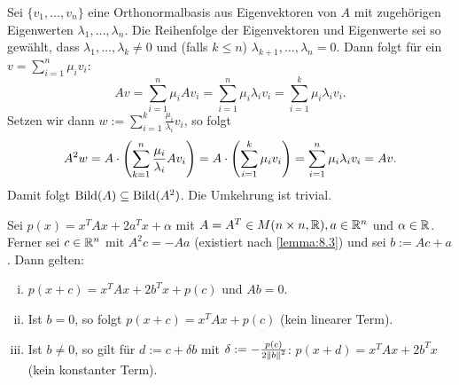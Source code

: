 \begin{beweis}
	Sei $\{v_1,\dots,v_n\}$ eine Orthonormalbasis aus Eigenvektoren von $A$ mit zugehörigen Eigenwerten $\lambda_1,\dots,\lambda_n$.
	Die Reihenfolge der Eigenvektoren und Eigenwerte sei so gewählt, dass $\lambda_1,\dots,\lambda_k \neq 0$ und (falls $k \leq n$) $\lambda_{k+1}, \dots, \lambda_n = 0$.
	Dann folgt für ein $v = \sum_{i=1}^{n} \mu_i v_i$:
	\[
		Av = \sum_{i=1}^{n} \mu_i Av_i = \sum_{i=1}^{n} \mu_i \lambda_i v_i = \sum_{i=1}^{k} \mu_i \lambda_i v_i.
	\]
	Setzen wir dann $w := \sum_{i=1}^{k} \frac{\mu_i}{\lambda_i} v_i$, so folgt
	\[
		A^2w = A \cdot \left(\sum_{k=1}^{n} \frac{\mu_i}{\lambda_i} Av_i\right) = A \cdot \left(\sum_{i=1}^{k} \mu_i v_i\right) = \sum_{i=1}^{n} \mu_i \lambda_i v_i = Av.
	\]
	Damit folgt $\operatorname{Bild}(A) \subseteq \operatorname{Bild}(A^2)$.
	Die Umkehrung ist trivial. \qedhere
\end{beweis}

\begin{lemma}
	\label{lemma:8.4}
	Sei $p(x) = x^T A x + 2a^Tx + \alpha$ mit $A = A^T \in M(n \times n, \mathbb{R}), a \in \mathbb{R}^n$ und $\alpha \in \mathbb{R}$.
	Ferner sei $c \in \mathbb{R}^n$ mit $A^2c = -Aa$ (existiert nach \autoref{lemma:8.3}) und sei $b := Ac + a$.
	Dann gelten:
	\begin{enumerate}[(i)]
		\item $p(x+c) = x^T Ax + 2b^Tx + p(c)$ und $Ab = 0$.
		\item Ist $b = 0$, so folgt $p(x+c) = x^TAx + p(c)$ (kein linearer Term).
		\item Ist $b \neq 0$, so gilt für $d := c+\delta b$ mit $\delta := - \frac{p(c)}{2 \left\lVert b\right\rVert^2}$: $p(x+d) = x^TAx + 2b^Tx$ (kein konstanter Term).
	\end{enumerate}
\end{lemma}

